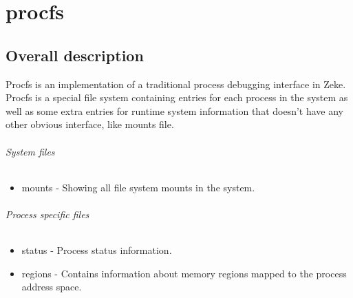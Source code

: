 \chapter{procfs}

\section{Overall description}

Procfs is an implementation of a traditional process debugging interface in
Zeke. Procfs is a special file system containing entries for each process
in the system as well as some extra entries for runtime system information that
doesn't have any other obvious interface, like mounts file.

\subparagraph{System files}
\begin{itemize}
    \item mounts    - Showing all file system mounts in the system.
\end{itemize}

\subparagraph{Process specific files}
\begin{itemize}
    \item status    - Process status information.
    \item regions   - Contains information about memory regions mapped to
                      the process address space.
\end{itemize}

